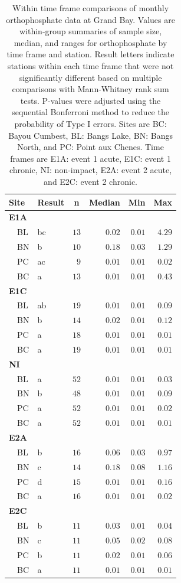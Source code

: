 \documentclass[letterpaper,12pt]{article}\usepackage[]{graphicx}\usepackage[]{color}
\begin{document}
\clearpage

\begin{table}[!tbp]
\caption{Within time frame comparisons of monthly orthophosphate data at Grand Bay.  Values are within-group summaries of sample size, median, and ranges for orthophosphate by time frame and station.  Result letters indicate stations within each time frame that were not significantly different based on multiple comparisons with Mann-Whitney rank sum tests.  P-values were adjusted using the sequential Bonferroni method to reduce the probability of Type I errors. Sites are BC: Bayou Cumbest, BL: Bangs Lake, BN: Bangs North, and PC: Point aux Chenes.  Time frames are E1A: event 1 acute, E1C: event 1 chronic, NI: non-impact, E2A: event 2 acute, and E2C: event 2 chronic.\label{tab:orthtab2}} 
\begin{center}
\begin{tabular}{llrrrr}
\hline\hline
\multicolumn{1}{l}{Site}&\multicolumn{1}{c}{Result}&\multicolumn{1}{c}{n}&\multicolumn{1}{c}{Median}&\multicolumn{1}{c}{Min}&\multicolumn{1}{c}{Max}\tabularnewline
\hline
{\bfseries E1A}&&&&&\tabularnewline
~~BL&bc&$13$&$0.02$&$0.01$&$4.29$\tabularnewline
~~BN&b&$10$&$0.18$&$0.03$&$1.29$\tabularnewline
~~PC&ac&$ 9$&$0.01$&$0.01$&$0.02$\tabularnewline
~~BC&a&$13$&$0.01$&$0.01$&$0.43$\tabularnewline
\hline
{\bfseries E1C}&&&&&\tabularnewline
~~BL&ab&$19$&$0.01$&$0.01$&$0.09$\tabularnewline
~~BN&b&$14$&$0.02$&$0.01$&$0.12$\tabularnewline
~~PC&a&$18$&$0.01$&$0.01$&$0.01$\tabularnewline
~~BC&a&$19$&$0.01$&$0.01$&$0.01$\tabularnewline
\hline
{\bfseries NI}&&&&&\tabularnewline
~~BL&a&$52$&$0.01$&$0.01$&$0.03$\tabularnewline
~~BN&b&$48$&$0.01$&$0.01$&$0.09$\tabularnewline
~~PC&a&$52$&$0.01$&$0.01$&$0.02$\tabularnewline
~~BC&a&$52$&$0.01$&$0.01$&$0.01$\tabularnewline
\hline
{\bfseries E2A}&&&&&\tabularnewline
~~BL&b&$16$&$0.06$&$0.03$&$0.97$\tabularnewline
~~BN&c&$14$&$0.18$&$0.08$&$1.16$\tabularnewline
~~PC&d&$15$&$0.01$&$0.01$&$0.16$\tabularnewline
~~BC&a&$16$&$0.01$&$0.01$&$0.02$\tabularnewline
\hline
{\bfseries E2C}&&&&&\tabularnewline
~~BL&b&$11$&$0.03$&$0.01$&$0.04$\tabularnewline
~~BN&c&$11$&$0.05$&$0.02$&$0.08$\tabularnewline
~~PC&b&$11$&$0.02$&$0.01$&$0.06$\tabularnewline
~~BC&a&$11$&$0.01$&$0.01$&$0.01$\tabularnewline
\hline
\end{tabular}\end{center}

\end{table}
\end{document}
